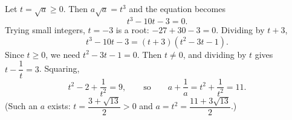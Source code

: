 Let $t=\sqrt a\ge0$. Then $a\sqrt a=t^3$ and the equation becomes
\[t^3-10t-3=0 .\]
Trying small integers, $t=-3$ is a root: $-27+30-3=0$. Dividing by $t+3$,
\[t^3-10t-3=(t+3)\left(t^2-3t-1\right).\]
Since $t\ge0$, we need $t^2-3t-1=0$. Then $t\ne0$, and dividing by $t$ gives $t-\dfrac{1}{t}=3$. Squaring,
\[t^2-2+\dfrac{1}{t^2}=9,\qquad\text{so}\qquad a+\dfrac{1}{a}=t^2+\dfrac{1}{t^2}=\boxed{11}.\]
(Such an $a$ exists: $t=\dfrac{3+\sqrt{13}}{2}>0$ and $a=t^2=\dfrac{11+3\sqrt{13}}{2}$.)
